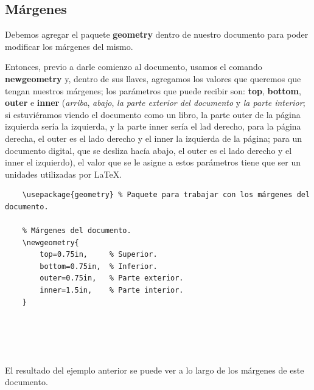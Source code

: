 \subsection{Márgenes}
\hspace{0.55cm}Debemos agregar el paquete \textbf{geometry} dentro de nuestro documento para poder modificar los márgenes del mismo.

Entonces, previo a darle comienzo al documento, usamos el comando \textbf{newgeometry} y, dentro de sus llaves, agregamos los valores que queremos que tengan nuestros márgenes; los parámetros que puede recibir son: \textbf{top}, \textbf{bottom}, \textbf{outer} e \textbf{inner} (\textit{arriba}, \textit{abajo}, \textit{la parte exterior del documento} y \textit{la parte interior}; si estuviéramos viendo el documento como un libro, la parte outer de la página izquierda sería la izquierda, y la parte inner sería el lad derecho, para la página derecha, el outer es el lado derecho y el inner la izquierda de la página; para un documento digital, que se desliza hacía abajo, el outer es el lado derecho y el inner el izquierdo), el valor que se le asigne a estos parámetros tiene que ser un unidades utilizadas por \LaTeX.
\begin{lstlisting}
    \usepackage{geometry} % Paquete para trabajar con los márgenes del documento.
    
    % Márgenes del documento.
    \newgeometry{
        top=0.75in,     % Superior.
        bottom=0.75in,  % Inferior.
        outer=0.75in,   % Parte exterior.
        inner=1.5in,    % Parte interior.
    }
    
    
    
    
\end{lstlisting}

El resultado del ejemplo anterior se puede ver a lo largo de los márgenes de este documento.


